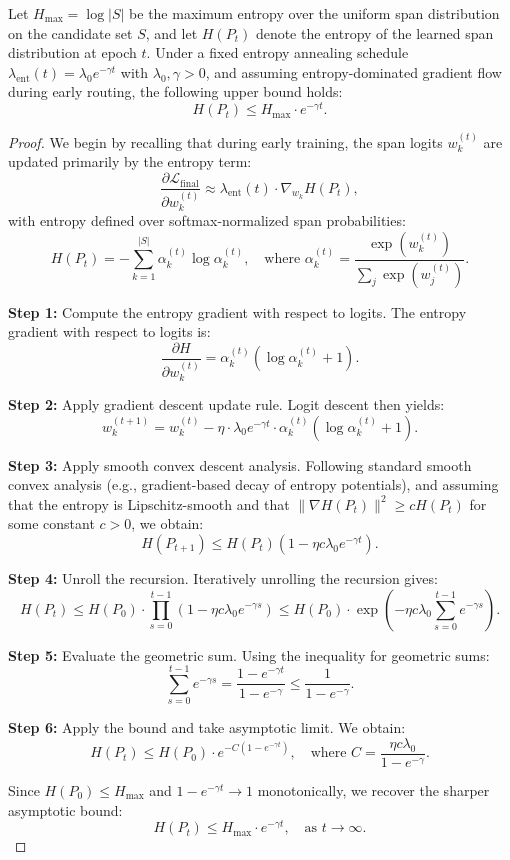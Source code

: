 \vspace{0.75em}
\begin{proposition}
\label{prop:routing_convergence}
Let \(H_{\max} = \log |S|\) be the maximum entropy over the uniform span distribution on the candidate set \(S\), and let \(H(P_t)\) denote the entropy of the learned span distribution at epoch \(t\). Under a fixed entropy annealing schedule \(\lambda_{\mathrm{ent}}(t) = \lambda_0 e^{-\gamma t}\) with \(\lambda_0, \gamma > 0\), and assuming entropy-dominated gradient flow during early routing, the following upper bound holds:
\[
H(P_t) \leq H_{\max} \cdot e^{-\gamma t}.
\]
\end{proposition}

\begin{proof}
We begin by recalling that during early training, the span logits \(w_k^{(t)}\) are updated primarily by the entropy term:
\[
\frac{\partial \mathcal{L}_{\text{final}}}{\partial w_k^{(t)}} \approx \lambda_{\mathrm{ent}}(t) \cdot \nabla_{w_k} H(P_t),
\]
with entropy defined over softmax-normalized span probabilities:
\[
H(P_t) = -\sum_{k=1}^{|S|} \alpha_k^{(t)} \log \alpha_k^{(t)}, \quad \text{where } \alpha_k^{(t)} = \frac{\exp(w_k^{(t)})}{\sum_j \exp(w_j^{(t)})}.
\]

\textbf{Step 1:} Compute the entropy gradient with respect to logits.
The entropy gradient with respect to logits is:
\[
\frac{\partial H}{\partial w_k^{(t)}} = \alpha_k^{(t)} \left( \log \alpha_k^{(t)} + 1 \right).
\]

\textbf{Step 2:} Apply gradient descent update rule.
Logit descent then yields:
\[
w_k^{(t+1)} = w_k^{(t)} - \eta \cdot \lambda_0 e^{-\gamma t} \cdot \alpha_k^{(t)} (\log \alpha_k^{(t)} + 1).
\]

\textbf{Step 3:} Apply smooth convex descent analysis.
Following standard smooth convex analysis (e.g., gradient-based decay of entropy potentials), and assuming that the entropy is Lipschitz-smooth and that \(\|\nabla H(P_t)\|^2 \geq c H(P_t)\) for some constant \(c > 0\), we obtain:
\[
H(P_{t+1}) \leq H(P_t) \left(1 - \eta c \lambda_0 e^{-\gamma t}\right).
\]

\textbf{Step 4:} Unroll the recursion.
Iteratively unrolling the recursion gives:
\[
H(P_t) \leq H(P_0) \cdot \prod_{s=0}^{t-1} \left(1 - \eta c \lambda_0 e^{-\gamma s}\right) \leq H(P_0) \cdot \exp\left(-\eta c \lambda_0 \sum_{s=0}^{t-1} e^{-\gamma s} \right).
\]

\textbf{Step 5:} Evaluate the geometric sum.
Using the inequality for geometric sums:
\[
\sum_{s=0}^{t-1} e^{-\gamma s} = \frac{1 - e^{-\gamma t}}{1 - e^{-\gamma}} \leq \frac{1}{1 - e^{-\gamma}}.
\]

\textbf{Step 6:} Apply the bound and take asymptotic limit.
We obtain:
\[
H(P_t) \leq H(P_0) \cdot e^{-C (1 - e^{-\gamma t})}, \quad \text{where } C = \frac{\eta c \lambda_0}{1 - e^{-\gamma}}.
\]

Since \(H(P_0) \leq H_{\max}\) and \(1 - e^{-\gamma t} \to 1\) monotonically, we recover the sharper asymptotic bound:
\[
H(P_t) \leq H_{\max} \cdot e^{-\gamma t}, \quad \text{as } t \to \infty.
\]
\end{proof}

